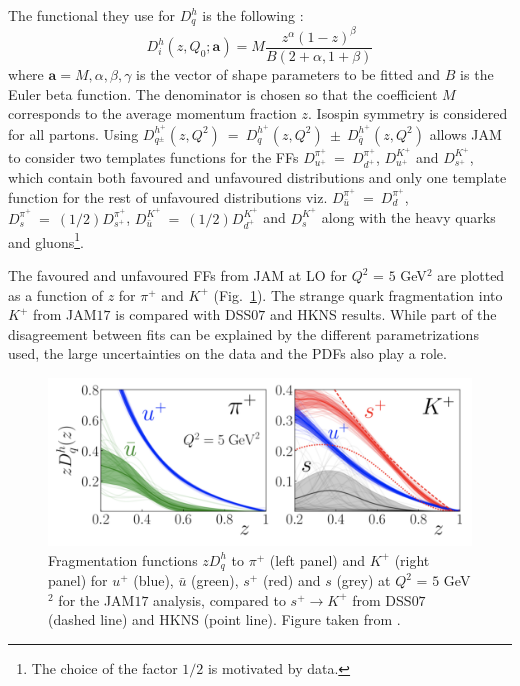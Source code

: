 The functional they use for $D^h_q$ is the following :
%
\begin{equation}
  D^h_i (z,Q_0;\textbf{a}) = M \frac{z^{\alpha}(1-z)^{\beta}}{B(2+\alpha,1+\beta)}
  \label{eq:JAMparam}
\end{equation}
%
where $\textbf{a} = {M,\alpha,\beta,\gamma}$ is the vector of shape parameters to be fitted and $B$ is the Euler beta function. The denominator is chosen so that the coefficient $M$ corresponds to the average momentum fraction $z$. Isospin symmetry is considered for all partons. Using $D^{h^{+}}_{q^{\pm}}(z,Q^2)~=~D^{h^{+}}_{q}(z,Q^2)~\pm~D^{h^{+}}_{\bar{q}}(z,Q^2)$ allows JAM to consider two templates functions for the FFs $D^{\pi^{+}}_{u^{+}}~=~D^{\pi^{+}}_{d^{+}}$, $D^{K^{+}}_{u^{+}}$ and $D^{K^{+}}_{s^{+}}$, which contain both favoured and unfavoured distributions and only one template function for the rest of unfavoured distributions viz. $D^{\pi^{+}}_{\bar{u}}~=~D^{\pi^{+}}_{d}$, $D^{\pi^{+}}_{s}~=~(1/2)D^{\pi^{+}}_{s^{+}}$, $D^{K^{+}}_{\bar{u}}~=~(1/2)D^{K^{+}}_{d^{+}}$ and $D^{K^{+}}_{s}$ along with the heavy quarks and gluons\footnote{The choice of the factor $1/2$ is motivated by data.}.

The favoured and unfavoured FFs from JAM at LO for $Q^2$ = $5$ GeV$^2$ are plotted as a function of $z$ for $\pi^+$ and $K^+$ (Fig.~\ref{pic:JAMcomp}). The strange quark fragmentation into $K^+$ from JAM$17$ is compared with DSS$07$ and HKNS results. While part of the disagreement between fits can be explained by the different parametrizations used, the large uncertainties on the data and the PDFs also play a role.

\begin{figure}[!h]
  \centering
	\includegraphics[scale=0.7]{./gfx/JAMcomp.png}
	\caption{Fragmentation functions $zD^h_q$ to $\pi^+$ (left panel) and $K^+$ (right panel) for $u^+$ (blue), $\bar{u}$ (green), $s^+$ (red) and $s$ (grey) at $Q^2$ = $5$ GeV$^2$ for the JAM$17$ analysis, compared to $s^+ \rightarrow K^+$ from DSS$07$ (dashed line) and HKNS (point line). Figure taken from \cite{JAM}.}
	\label{pic:JAMcomp}
\end{figure}

